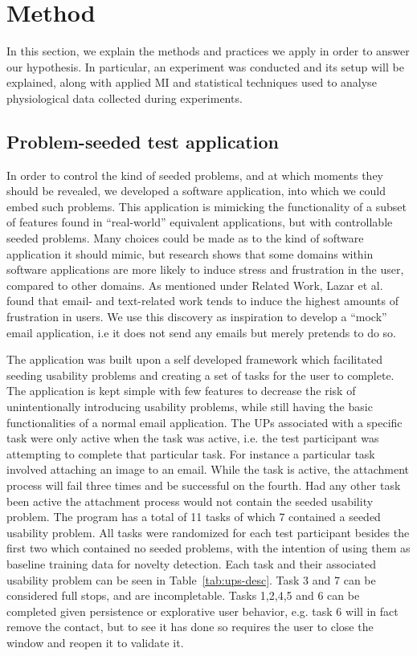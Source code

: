 \section{Method}
In this section, we explain the methods and practices we apply in order to answer our hypothesis. In particular, an
experiment was conducted and its setup will be explained, along with applied MI and statistical techniques used to
analyse physiological data collected during experiments.

\subsection{Problem-seeded test application}
In order to control the kind of seeded problems, and at which moments they should be revealed, we developed a software
application, into which we could embed such problems. This application is mimicking the functionality of a subset of
features found in ``real-world'' equivalent applications, but with controllable seeded problems.  Many choices could be
made as to the kind of software application it should mimic, but research shows that some domains within software
applications are more likely to induce stress and frustration in the user, compared to other domains.  As mentioned
under Related Work, Lazar et al.~\cite{frustration_with_computers} found that email- and text-related work tends to
induce the highest amounts of frustration in users. We use this discovery as inspiration to develop a ``mock'' email
application, i.e it does not send any emails but merely pretends to do so.

The application was built upon a self developed framework which facilitated seeding usability problems and creating a set of tasks for the user to complete. 
The application is kept simple with few features to decrease the risk of unintentionally introducing usability problems, while still having the basic functionalities of a normal email application.  
The UPs associated with a specific task were only active when the task was active, i.e. the test participant was
attempting to complete that particular task.
For instance a particular task involved attaching an image to an email. 
While the task is active, the attachment process will fail three times and be successful on the fourth. 
Had any other task been active the attachment process would not contain the seeded usability problem.
The program has a total of 11 tasks of which 7 contained a seeded usability problem. 
All tasks were randomized for each test participant besides the first two which contained no seeded problems, with the
intention of using them as baseline training data for novelty detection. 
Each task and their associated usability problem can be seen in Table~\ref{tab:ups-desc}.
Task 3 and 7 can be considered full stops, and are incompletable.
Tasks 1,2,4,5 and 6 can be completed given persistence or explorative user behavior, e.g. task 6 will in fact remove the contact, but to see it has done so requires the user to close the window and reopen it to validate it.

